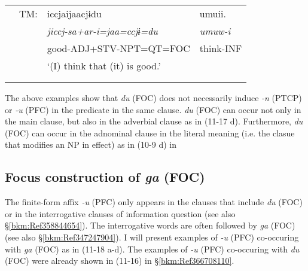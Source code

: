 \begin{tabularx}{\textwidth}{XXXXXXXXXXXXX}
& { TM:} & \multicolumn{6}{X}{{ iccjaijaacjɨdu}} & \multicolumn{5}{X}{{ umuii.}}\\
&  & \multicolumn{6}{X}{{ \textit{jiccj}\footnotemark{}\textit{{}-sa+ar-i=jaa=ccjɨ=du}}} & \multicolumn{5}{X}{{ \textit{umuw-i}}}\\
&  & \multicolumn{6}{X}{{ good-ADJ+STV-NPT=QT=FOC}} & \multicolumn{5}{X}{{ think-INF}}\\
&  & \multicolumn{11}{X}{{ ‘(I) think that (it) is good.’}}\\
&  & \multicolumn{11}{X}{\raggedleft [Co: 120415\_01.txt]}\\
\lspbottomrule
\end{tabularx}
\addtocounter{footnote}{-2}

The above examples show that \textit{du} (FOC) does not necessarily induce \textit{{}-n} (PTCP) or \textit{{}-u} (PFC) in the predicate in the same clause. \textit{du} (FOC) can occur not only in the main clause, but also in the adverbial clause as in (11-17 d). Furthermore, \textit{du} (FOC) can occur in the adnominal clause in the literal meaning (i.e. the clasue that modifies an NP in effect) as in (10-9 d) in 

\subsection{Focus construction of \textit{ga} (FOC)}
\label{bkm:Ref366708117}\hypertarget{RefHeadingToc395697263}{}
The finite-form affix \textit{{}-u} (PFC) only appears in the clauses that include \textit{du} (FOC) or in the interrogative clauses of information question (see also §\ref{bkm:Ref358844654}). The interrogative words are often followed by \textit{ga} (FOC) (see also §\ref{bkm:Ref347247904}). I will present examples of \textit{{}-u} (PFC) co-occuring with \textit{ga} (FOC) as in (11-18 a-d). The examples of \textit{-u} (PFC) co-occuring with \textit{du} (FOC) were already shown in (11-16) in §\ref{bkm:Ref366708110}.

\tablefirsthead{}

